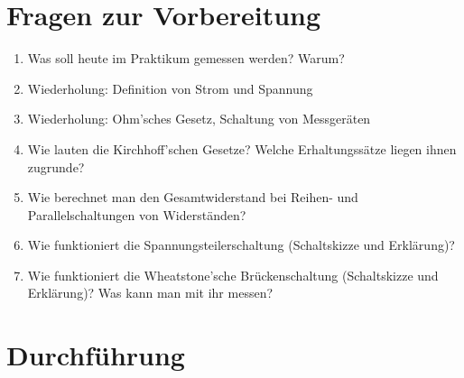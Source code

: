 \section{Fragen zur Vorbereitung}

\begin{enumerate}
 \item Was soll heute im Praktikum gemessen werden? Warum?
 \item Wiederholung: Definition von Strom und Spannung
 \item Wiederholung: Ohm'sches Gesetz, Schaltung von Messgeräten
 \item Wie lauten die Kirchhoff'schen Gesetze? Welche Erhaltungssätze liegen ihnen zugrunde?
 \item Wie berechnet man den Gesamtwiderstand bei Reihen- und Parallelschaltungen von Widerständen?
 \item Wie funktioniert die Spannungsteilerschaltung (Schaltskizze und Erklärung)?
 \item Wie funktioniert die Wheatstone'sche Brückenschaltung (Schaltskizze und Erklärung)? Was kann man mit ihr messen?
\end{enumerate}

\section{Durchführung} 

